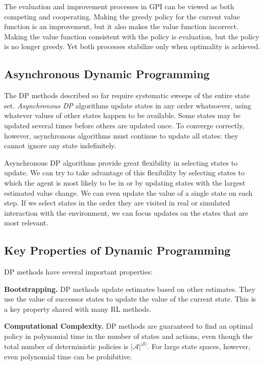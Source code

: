\documentclass[12pt]{article}
\begin{document}
The evaluation and improvement processes in GPI can be viewed as both competing and cooperating. Making the greedy policy for the current value function is an improvement, but it also makes the value function incorrect. Making the value function consistent with the policy is evaluation, but the policy is no longer greedy. Yet both processes stabilize only when optimality is achieved.

\subsection{Asynchronous Dynamic Programming}

The DP methods described so far require systematic sweeps of the entire state set. \textit{Asynchronous DP} algorithms update states in any order whatsoever, using whatever values of other states happen to be available. Some states may be updated several times before others are updated once. To converge correctly, however, asynchronous algorithms must continue to update all states: they cannot ignore any state indefinitely.

Asynchronous DP algorithms provide great flexibility in selecting states to update. We can try to take advantage of this flexibility by selecting states to which the agent is most likely to be in or by updating states with the largest estimated value change. We can even update the value of a single state on each step. If we select states in the order they are visited in real or simulated interaction with the environment, we can focus updates on the states that are most relevant.

\subsection{Key Properties of Dynamic Programming}

DP methods have several important properties:

\textbf{Bootstrapping.} DP methods update estimates based on other estimates. They use the value of successor states to update the value of the current state. This is a key property shared with many RL methods.

\textbf{Computational Complexity.} DP methods are guaranteed to find an optimal policy in polynomial time in the number of states and actions, even though the total number of deterministic policies is $|\mathcal{A}|^{|\mathcal{S}|}$. For large state spaces, however, even polynomial time can be prohibitive.
\end{document}
